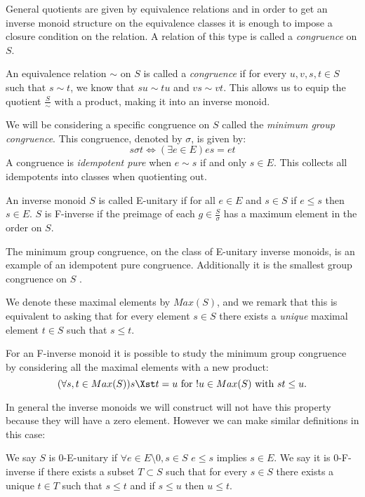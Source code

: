 General quotients are given by equivalence relations and in order to get an inverse monoid structure on the equivalence classes it is enough to impose a closure condition on the relation. A relation of this type is called a \textit{congruence} on $S$.

\begin{definition}
An equivalence relation $\sim$ on $S$ is called a \textit{congruence} if for every $u,v,s,t \in S$ such that $s \sim t$, we know that $su\sim tu$ and $vs \sim vt$. This allows us to equip the quotient $\frac{S}{\sim}$ with a product, making it into an inverse monoid.
\end{definition}

We will be considering a specific congruence on $S$ called the \textit{minimum group congruence}.  This congruence, denoted by $\sigma$, is given by:
\begin{equation*}
s \sigma t \Leftrightarrow (\exists e \in E) es = et
\end{equation*}
A congruence is \textit{idempotent pure} when $e \sim s$ if and only $s \in E$. This collects all idempotents into classes when quotienting out. 
\begin{definition}
An inverse monoid $S$ is called E-unitary if for all $e \in E$ and $s \in S$ if $e \leq s$ then $s \in E$. $S$ is F-inverse if the preimage of each $g \in \frac{S}{\sigma}$ has a maximum element in the order on $S$.
\end{definition}
The minimum group congruence, on the class of E-unitary inverse monoids, is an example of an idempotent pure congruence. Additionally it is the smallest group congruence on $S$ \cite{MR1694900}.

We denote these maximal elements by $Max(S)$, and we remark that this is equivalent to asking that for every element $s \in S$ there exists a \textit{unique} maximal element $t \in S$ such that $s \leq t$.

For an F-inverse monoid it is possible to study the minimum group congruence by considering all the maximal elements with a new product:
\begin{equation*}
(\forall s,t \in Max(S)) s \Xst t = u \mbox{ for } !u \in Max(S) \mbox{ with } st \leq u.
\end{equation*}

In general the inverse monoids we will construct will not have this property because they will have a zero element. However we can make similar definitions in this case:

\begin{definition}
We say $S$ is 0-E-unitary if $\forall e \in E\setminus 0, s \in S$ $e \leq s$ implies $s \in E$. We say it is 0-F-inverse if there exists a subset $T \subset S$ such that for every $s \in S$ there exists a unique $t \in T$ such that $s \leq t$ and if $s \leq u$ then $u \leq t$.
\end{definition}

